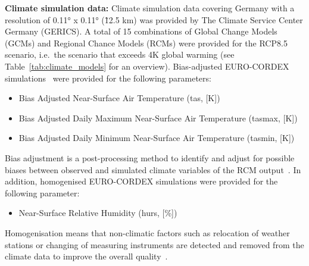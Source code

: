 \documentclass[a4paper, 11pt]{scrartcl}
\begin{document}
\textbf{Climate simulation data:} Climate simulation data covering Germany with a resolution of 0.11° x 0.11° (\~12.5 km) was provided by The Climate Service Center Germany (GERICS). A total of 15 combinations of Global Change Models (GCMs) and Regional Chance Models (RCMs) were provided for the RCP8.5 scenario, i.e.\ the scenario that exceeds 4K global warming (see Table~\ref{tab:climate_models} for an overview). Bias-adjusted EURO-CORDEX simulations~\parencite{Jacob.2014} were provided for the following parameters:
\begin{itemize}[noitemsep]
\item Bias Adjusted Near-Surface Air Temperature (tas, [K])
\item Bias Adjusted Daily Maximum Near-Surface Air Temperature (tasmax, [K])
\item Bias Adjusted Daily Minimum Near-Surface Air Temperature (tasmin, [K])
\end{itemize}

Bias adjustment is a post-processing method to identify and adjust for possible biases between observed and simulated climate variables of the RCM output~\parencite{Teutschbein.2012, Maraun.2016}. In addition, homogenised EURO-CORDEX simulations were provided for the following parameter:

\begin{itemize}
\item Near-Surface Relative Humidity (hurs, [\%])
\end{itemize}

Homogenisation means that non-climatic factors such as relocation of weather stations or changing of measuring instruments are detected and removed from the climate data to improve the overall quality~\parencite{Ribeiro.2016, Costa.2009}.
\end{document}

